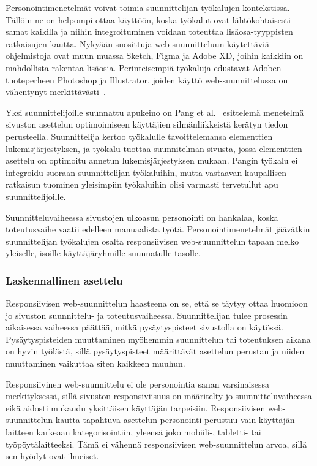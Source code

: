 \documentclass[finnish, 12pt, a4paper, elec, utf8, a-1b, online]{aaltothesis}
\begin{document}
Personointimenetelmät voivat toimia suunnittelijan työkalujen kontekstissa.
Tällöin ne on helpompi ottaa käyttöön, koska työkalut ovat lähtökohtaisesti
samat kaikilla ja niihin integroituminen voidaan toteuttaa lisäosa-tyyppisten
ratkaisujen kautta. Nykyään suosittuja web-suunnitteluun käytettäviä
ohjelmistoja ovat muun muassa Sketch, Figma ja Adobe XD, joihin kaikkiin on
mahdollista rakentaa lisäosia. Perinteisempiä työkaluja edustavat Adoben
tuoteperheen Photoshop ja Illustrator, joiden käyttö web-suunnittelussa on
vähentynyt merkittävästi~\cite{webdesignmuseum_2022}.

Yksi suunnittelijoille suunnattu apukeino on Pang et al.~\cite{10.1145/2980179.2982422}
esittelemä menetelmä sivuston asettelun optimoimiseen käyttäjien
silmänliikkeistä kerätyn tiedon perusteella. Suunnittelija kertoo työkalulle
tavoittelemansa elementtien lukemisjärjestyksen, ja työkalu tuottaa suunnitelman
sivusta, jossa elementtien asettelu on optimoitu annetun lukemisjärjestyksen
mukaan. Pangin työkalu ei integroidu suoraan suunnittelijan työkaluihin, mutta
vastaavan kaupallisen ratkaisun tuominen yleisimpiin työkaluihin olisi varmasti
tervetullut apu suunnittelijoille.

Suunnitteluvaiheessa sivustojen ulkoasun personointi on hankalaa, koska
toteutusvaihe vaatii edelleen manuaalista työtä. Personointimenetelmät jäävätkin
suunnittelijan työkalujen osalta responsiivisen web-suunnittelun tapaan melko
yleiselle, isoille käyttäjäryhmille suunnatulle tasolle.

\subsubsection{Laskennallinen asettelu}

Responsiivisen web-suunnittelun haasteena on se, että se täytyy ottaa huomioon
jo sivuston suunnittelu- ja toteutusvaiheessa. Suunnittelijan tulee prosessin
aikaisessa vaiheessa päättää, mitkä pysäytyspisteet sivustolla on käytössä.
Pysäytyspisteiden muuttaminen myöhemmin suunnittelun tai toteutuksen aikana on
hyvin työlästä, sillä pysäytyspisteet määrittävät asettelun perustan ja niiden
muuttaminen vaikuttaa siten kaikkeen muuhun.

Responsiivinen web-suunnittelu ei ole personointia sanan varsinaisessa
merkityksessä, sillä sivuston responsiviisuus on määritelty jo
suunnitteluvaiheessa eikä aidosti mukaudu yksittäisen käyttäjän tarpeisiin.
Responsiivisen web-suunnittelun kautta tapahtuva asettelun personointi perustuu
vain käyttäjän laitteen karkeaan kategorisointiin, yleensä joko mobiili-,
tabletti- tai työpöytälaitteeksi. Tämä ei vähennä responsiivisen
web-suunnittelun arvoa, sillä sen hyödyt ovat ilmeiset.
\end{document}
